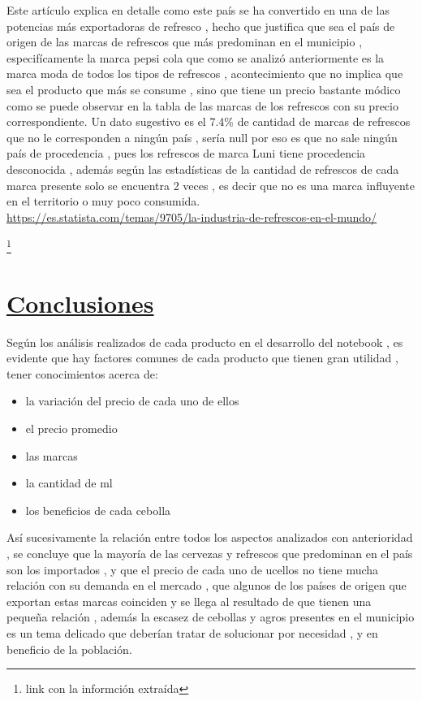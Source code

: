 \documentclass[twocolumn,12pt]{article}
\begin{document}
Este artículo explica en detalle como este país se ha convertido en una de las potencias más exportadoras de refresco , hecho que justifica que sea el país de origen de las marcas de refrescos que más predominan en el municipio , especifícamente la marca pepsi cola que como se analizó anteriormente es la marca moda de todos los tipos de refrescos , acontecimiento que no implica que sea el producto que  más  se consume , sino que tiene un precio bastante módico  como se puede observar en la tabla de las marcas de los refrescos con su precio correspondiente.
Un dato sugestivo es el 7.4\% de cantidad de marcas de refrescos que no le corresponden a ningún país , sería null por eso es que no sale ningún país de procedencia , pues los refrescos de marca Luni tiene procedencia desconocida , además según las estadísticas de la cantidad de refrescos de cada marca presente solo se encuentra 2 veces , es decir que no es una marca influyente en el territorio o muy poco consumida.\\


\newpage
\url{https://es.statista.com/temas/9705/la-industria-de-refrescos-en-el-mundo/}

\footnote{link con la informción extraída}

\newpage
\section{{\LARGE \underline{Conclusiones}}}

Según los análisis realizados de cada producto en el desarrollo del notebook , es evidente que hay factores comunes de cada producto que tienen gran utilidad , tener conocimientos acerca de:

\begin{itemize}
	\item{la variación del precio de cada uno de ellos}
	\item{el precio promedio}
	\item{las marcas}
	\item{la cantidad de ml}
	\item{los beneficios de cada cebolla}
\end{itemize}
	
Así sucesivamente la relación  entre todos los aspectos analizados con anterioridad , se concluye que la  mayoría de las cervezas y refrescos que predominan en el país son los importados , y que el precio de cada uno de ucellos no tiene mucha relación con su demanda en el mercado , que algunos de los países de origen que exportan estas marcas coinciden y se llega al resultado de que tienen una pequeña relación , además la escasez de cebollas y agros presentes en el municipio es un tema delicado que deberían tratar de solucionar por necesidad  , y en beneficio de la población.


\newpage
\tableofcontents
\end{document}
